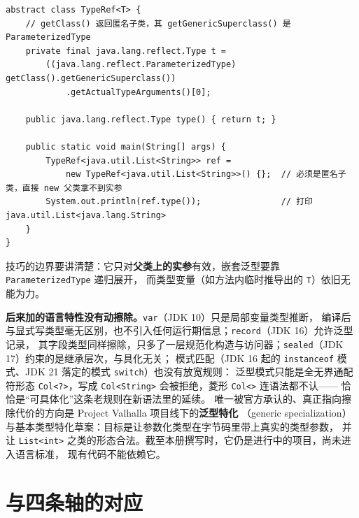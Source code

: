 \documentclass[12pt,a4paper,fontset=fandol]{ctexbook}
\newcommand{\javalabel}{%
  \tcbox[on line,colback=javaheadbg,colframe=javaheadbg,
    boxrule=0pt,arc=1pt,left=2pt,right=2pt,top=1pt,bottom=1pt,
    colupper=white,fontupper=\scriptsize\bfseries]{Java}}
\newcommand{\kw}[1]{\texttt{#1}}
\begin{document}
\javalabel
\begin{lstlisting}[style=javastyle,caption={super type token：借匿名子类的父类签名把类型参数带到运行期（Jackson 的 TypeReference、Guava 的 TypeToken 同一原理）}]
abstract class TypeRef<T> {
    // getClass() 返回匿名子类，其 getGenericSuperclass() 是 ParameterizedType
    private final java.lang.reflect.Type t =
        ((java.lang.reflect.ParameterizedType) getClass().getGenericSuperclass())
            .getActualTypeArguments()[0];

    public java.lang.reflect.Type type() { return t; }

    public static void main(String[] args) {
        TypeRef<java.util.List<String>> ref =
            new TypeRef<java.util.List<String>>() {};  // 必须是匿名子类，直接 new 父类拿不到实参
        System.out.println(ref.type());                // 打印 java.util.List<java.lang.String>
    }
}
\end{lstlisting}

技巧的边界要讲清楚：它只对\textbf{父类上的实参}有效，嵌套泛型要靠 \kw{ParameterizedType} 递归展开，
而类型变量（如方法内临时推导出的 \kw{T}）依旧无能为力。

\textbf{后来加的语言特性没有动擦除。}\kw{var}（JDK 10）只是局部变量类型推断，
编译后与显式写类型毫无区别，也不引入任何运行期信息；\kw{record}（JDK 16）允许泛型记录，
其字段类型同样擦除，只多了一层规范化构造与访问器；\kw{sealed}（JDK 17）约束的是继承层次，与具化无关；
模式匹配（JDK 16 起的 \kw{instanceof} 模式、JDK 21 落定的模式 \kw{switch}）也没有放宽规则：
泛型模式只能是全无界通配符形态 \kw{Col<?>}，写成 \kw{Col<String>} 会被拒绝，菱形 \kw{Col<>} 连语法都不认——
恰恰是“可具体化”这条老规则在新语法里的延续。
唯一被官方承认的、真正指向擦除代价的方向是 Project Valhalla 项目线下的\textbf{泛型特化}
（generic specialization）与基本类型特化草案：目标是让参数化类型在字节码里带上真实的类型参数，
并让 \kw{List<int>} 之类的形态合法。截至本册撰写时，它仍是进行中的项目，尚未进入语言标准，
现有代码不能依赖它。

\section{与四条轴的对应}
\end{document}

